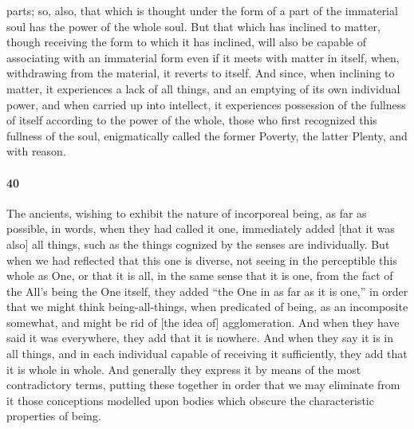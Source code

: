 \documentclass[12pt]{article}
\begin{document}
parts; so, also, that which is thought under the form of a part of the
immaterial soul has the power of the whole soul. But that which has inclined to
matter, though receiving the form to which it has inclined, will also be
capable of associating with an immaterial form even if it meets with matter in
itself, when, withdrawing from the material, it reverts to itself. And since,
when inclining to matter, it experiences a lack of all things, and an emptying
of its own individual power, and when carried up into intellect, it experiences
possession of the fullness of itself according to the power of the whole, those
who first recognized this fullness of the soul, enigmatically called the former
Poverty, the latter Plenty, and with reason.

\paragraph{40} The ancients, wishing to exhibit the nature of incorporeal
being, as far as possible, in words, when they had called it one, immediately
added [that it was also] all things, such as the things cognized by the senses
are individually. But when we had reflected that this one is diverse, not
seeing in the perceptible this whole as One, or that it is all, in the same
sense that it is one, from the fact of the All's being the One itself, they
added ``the One in as far as it is one,'' in order that we might think
being-all-things, when predicated of being, as an incomposite somewhat, and
might be rid of [the idea of] agglomeration. And when they have said it was
everywhere, they add that it is nowhere. And when they say it is in all things,
and in each individual capable of receiving it sufficiently, they add that it
is whole in whole. And generally they express it by means of the most
contradictory terms, putting these together in order that we may eliminate from
it those conceptions modelled upon bodies which obscure the characteristic
properties of being.
\end{document}
